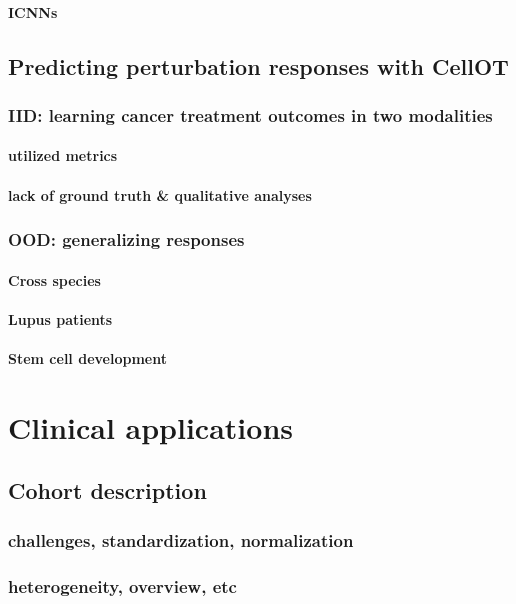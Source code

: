 \subsubsection{ICNNs}

\section{Predicting perturbation responses with CellOT}
\subsection{IID: learning cancer treatment outcomes in two modalities}
\subsubsection{utilized metrics}
\subsubsection{lack of ground truth \& qualitative analyses}

\subsection{OOD: generalizing responses}
\subsubsection{Cross species}
\subsubsection{Lupus patients}
\subsubsection{Stem cell development}

\chapter{Clinical applications}
\section{Cohort description}
\subsection{challenges, standardization,  normalization}
\subsection{heterogeneity, overview, etc}

